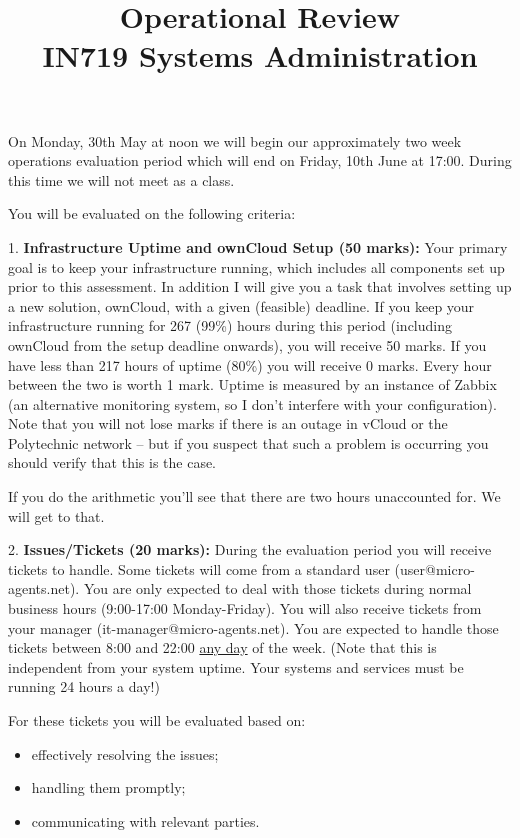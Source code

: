 \documentclass{article}   	%
\title{Operational Review\\ IN719 Systems Administration}
\date{}							%
\begin{document}
\maketitle


On Monday, 30th May at noon we will begin our approximately two week operations evaluation period which will end on Friday, 10th June at 17:00.  During this time we will not meet as a class.

You will be evaluated on the following criteria:

\vspace{0.5cm}

1.  \textbf{Infrastructure Uptime and ownCloud Setup (50 marks):}  Your primary goal is to keep your infrastructure running, which includes all components set up prior to this assessment. In addition I will give you a task that involves setting up a new solution, ownCloud, with a given (feasible) deadline.  If you keep your infrastructure running for 267 (99\%) hours during this period (including ownCloud from the setup deadline onwards), you will receive 50 marks.  If you have less than 217 hours of uptime (80\%) you will receive 0 marks.  Every hour between the two is worth 1 mark.  Uptime is measured by an instance of Zabbix (an alternative monitoring system, so I don't interfere with your configuration).  Note that you will not lose marks if there is an outage in vCloud or the Polytechnic network -- but if you suspect that such a problem is occurring you should verify that this is the case.

If you do the arithmetic you'll see that there are two hours unaccounted for.  We will get to that.

\vspace{0.5cm}

2.  \textbf{Issues/Tickets (20 marks):}  During the evaluation period you will receive tickets to handle.  Some tickets will come from a standard user (user@micro-agents.net).  You are only expected to deal with those tickets during normal business hours (9:00-17:00 Monday-Friday).  You will also receive tickets from your manager (it-manager@micro-agents.net).  You are expected to handle those tickets between 8:00 and 22:00 \underline{any day} of the week. (Note that this is independent from your system uptime. Your systems and services must be running 24 hours a day!) 

For these tickets you will be evaluated based on:

\begin{itemize}
\item effectively resolving the issues;
\item handling them promptly;
\item communicating with relevant parties.
\end{itemize}
\end{document}
